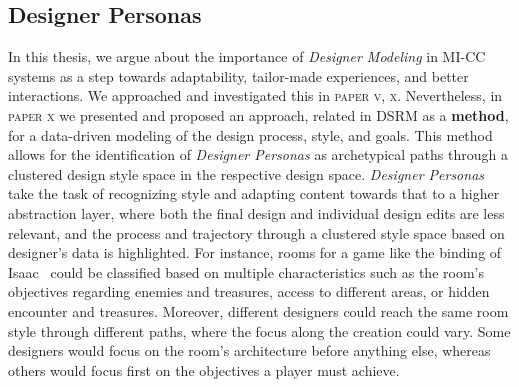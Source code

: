 
\subsection{Designer Personas}

In this thesis, we argue about the importance of \emph{Designer Modeling} in MI-CC systems as a step towards adaptability, tailor-made experiences, and better interactions. We approached and investigated this in \textsc{paper v, x}. Nevertheless, in \textsc{paper x} we presented and proposed an approach, related in DSRM as a \textbf{method}, for a data-driven modeling of the design process, style, and goals. This method allows for the identification of \emph{Designer Personas} as archetypical paths through a clustered design style space in the respective design space. \emph{Designer Personas} take the task of recognizing style and adapting content towards that to a higher abstraction layer, where both the final design and individual design edits are less relevant, and the process and trajectory through a clustered style space based on designer's data is highlighted.  For instance, rooms for a game like the binding of Isaac~\cite{mcmillen_binding_2011} could be classified based on multiple characteristics such as the room's objectives regarding enemies and treasures, access to different areas, or hidden encounter and treasures. Moreover, different designers could reach the same room style through different paths, where the focus along the creation could vary. Some designers would focus on the room's architecture before anything else, whereas others would focus first on the objectives a player must achieve.

